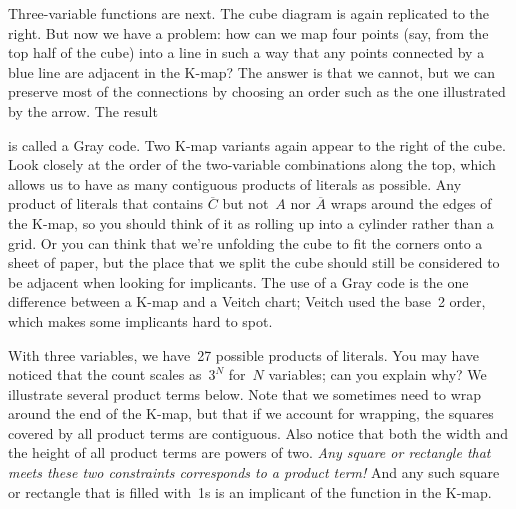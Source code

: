 \begin{minipage}{2.6in}
Three-variable functions are next.  The cube diagram is again replicated
to the right.  But now we have a problem: how can we map four points
(say, from the top half of the cube) into a line in such a way that 
any points connected by a blue line are adjacent in the \mbox{K-map}?
The answer is that we cannot, but we can preserve most of the connections
by choosing an order such as the one illustrated by the arrow.
The result\linebreak
\end{minipage}\hspace{0.25in}%
\begin{minipage}{3.65in}
\vspace{12pt}
\end{minipage}\mpdone

is called a Gray code.  Two \mbox{K-map} variants again appear
to the right of the cube.  Look closely at the order of the two-variable
combinations along the top, which allows us to have as many contiguous
products of literals as possible.  Any product of literals that contains
$\overline{C}$ but not~$A$ nor $\overline{A}$ wraps around the edges
of the \mbox{K-map}, so you should think of it as rolling up into a cylinder 
rather than a grid.  Or you can think that we're unfolding the cube to
fit the corners onto a sheet of paper, but the place that we split
the cube should still be considered to be adjacent when looking for 
implicants.  The use of a Gray code is the one difference between a
\mbox{K-map} and a Veitch chart; Veitch used the base~2 order, which
makes some implicants hard to spot.

With three variables, we have~27 possible products of literals.  You
may have noticed that the count scales as~$3^N$ for~$N$ variables;
can you explain why?  We illustrate several product terms
below.  Note that we sometimes
need to wrap around the end of the \mbox{K-map}, but that if we account
for wrapping, the squares covered by all product terms are contiguous.
Also notice that both the width and the height of all product terms 
are powers of two.  {\em Any square or rectangle that meets these two 
constraints corresponds to a product term!}  And any such square or 
rectangle that is filled with~1s is an implicant of the function
in the \mbox{K-map}.\\

\centerline{}

